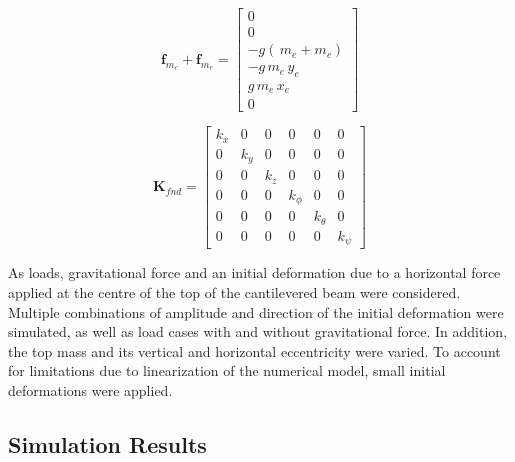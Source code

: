 \documentclass{article}
\begin{document}
\begin{small}
    \begin{equation}
        \mathbf{f}_{m_c} + \mathbf{f}_{m_e} = 
        \begin{bmatrix}
         0\\ 0\\ -g(\,m_{e}+m_{c})\\ -g\,m_{e}\,y_{e}\\ g\,m_{e}\,x_{e} \\ 0
        \end{bmatrix}
        \label{eq:fea:Fstat}
    \end{equation}
\end{small}

\begin{small}
    \begin{equation}
        \mathbf{K}_{fnd} =
        \begin{bmatrix}
         k_{x} &     0 & 0     & 0         & 0           & 0         \\ 
         0     & k_{y} & 0     & 0         & 0           & 0         \\
         0     & 0     & k_{z} & 0         & 0           & 0         \\
         0     & 0     & 0     & k_{\phi } & 0           & 0         \\
         0     & 0     & 0     & 0         & k_{\theta } & 0         \\ 
         0     & 0     & 0     & 0         & 0           & k_{\psi } 
        \end{bmatrix}
        \label{eq:fea:K_fnd}
    \end{equation}
\end{small}

As loads, gravitational force and an initial deformation due to a horizontal force applied at the centre of the top of the cantilevered beam were considered. Multiple combinations of amplitude and direction of the initial deformation were simulated, as well as load cases with and without gravitational force. In addition, the top mass and its vertical and horizontal eccentricity were varied. To account for limitations due to linearization of the numerical model, small initial deformations were applied.

\subsection{Simulation Results}
\end{document}

